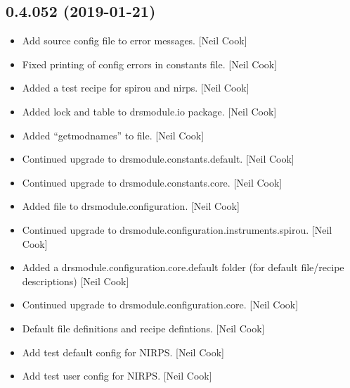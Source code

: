\documentclass[a4paper,10pt,english]{report}
\begin{document}
\subsection{0.4.052 (2019-01-21)}
\label{\detokenize{misc/changelog:id211}}\begin{itemize}
\item {} 
Add source config file to error messages. {[}Neil Cook{]}

\item {} 
Fixed printing of config errors in constants file. {[}Neil Cook{]}

\item {} 
Added a test recipe for spirou and nirps. {[}Neil Cook{]}

\item {} 
Added lock and table to drsmodule.io package. {[}Neil Cook{]}

\item {} 
Added “getmodnames” to  file. {[}Neil Cook{]}

\item {} 
Continued upgrade to drsmodule.constants.default. {[}Neil Cook{]}

\item {} 
Continued upgrade to drsmodule.constants.core. {[}Neil Cook{]}

\item {} 
Added  file to drsmodule.configuration. {[}Neil Cook{]}

\item {} 
Continued upgrade to drsmodule.configuration.instruments.spirou. {[}Neil
Cook{]}

\item {} 
Added a drsmodule.configuration.core.default folder (for default
file/recipe descriptions) {[}Neil Cook{]}

\item {} 
Continued upgrade to drsmodule.configuration.core. {[}Neil Cook{]}

\item {} 
Default file definitions and recipe defintions. {[}Neil Cook{]}

\item {} 
Add test default config for NIRPS. {[}Neil Cook{]}

\item {} 
Add test user config for NIRPS. {[}Neil Cook{]}

\end{itemize}
\end{document}
